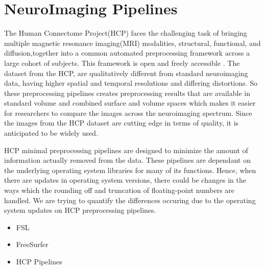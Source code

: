 \section{NeuroImaging Pipelines}
The Human Connectome Project(HCP) faces the challenging task of bringing multiple magnetic resonance imaging(MRI) modalities, structural, functional, and diffusion,together into a common automated preprocessing framework across a large cohort of subjects. This framework is open and freely accessible \cite{Gla13}. The dataset from the HCP, are qualitatively different from standard neuroimaging data, having higher spatial and temporal resolutions and differing distortions. So these preprocessing pipelines creates preprocessing results that are available in standard volume and combined surface and volume spaces which makes it easier for researchers to compare the images across the neuroimaging spectrum. Since the images from the HCP dataset are cutting edge in terms of quality, it is anticipated to be widely used.

HCP minimal preprocessing pipelines are designed to minimize the amount of information actually removed from the data. These pipelines are dependant on the underlying operating system libraries for many of its functions. Hence, when there are updates in operating system versions, there could be changes in the ways which the rounding off and truncation of floating-point numbers are handled. We are trying to quantify the differences occuring due to the operating system updates on HCP preprocessing pipelines.

\begin{itemize}
 \item FSL
 \item FreeSurfer
 \item HCP Pipelines
\end{itemize}


